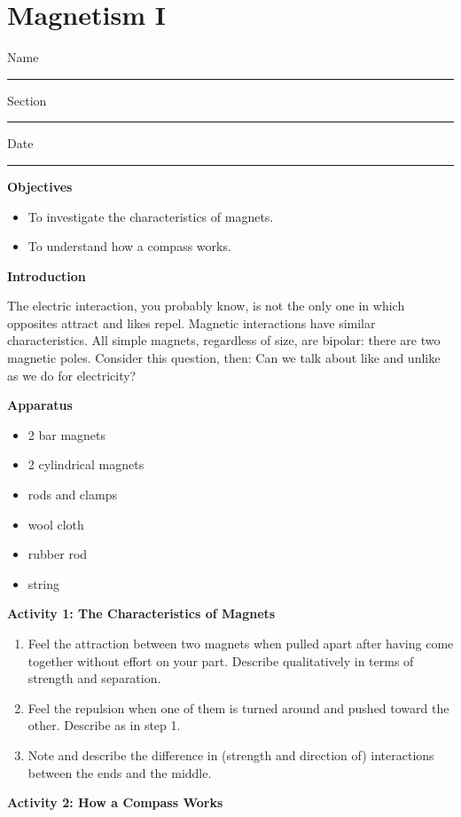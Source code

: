 
\section{Magnetism I}

Name \rule{2.0in}{0.1pt}\hfill{}Section \rule{1.0in}{0.1pt}\hfill{}Date
\rule{1.0in}{0.1pt}

\textbf{Objectives}

\begin{itemize}
\item To investigate the characteristics of magnets.
\item To understand how a compass works.
\end{itemize}
\textbf{Introduction} 

The electric interaction, you probably know, is not the only one in
which opposites attract and likes repel. Magnetic interactions have
similar characteristics. All simple magnets, regardless of size, are
bipolar: there are two magnetic poles. Consider this question, then:
Can we talk about like and unlike as we do for electricity?

\textbf{Apparatus}

\begin{itemize}
\item 2 bar magnets 
\item 2 cylindrical magnets 
\item rods and clamps
\item wool cloth
\item rubber rod
\item string
\end{itemize}
\textbf{Activity 1: The Characteristics of Magnets}

\begin{enumerate}
\item Feel the attraction between two magnets when pulled apart after having
come together without effort on your part. Describe qualitatively
in terms of strength and separation.\vspace{15mm}

\item Feel the repulsion when one of them is turned around and pushed toward
the other. Describe as in step 1.\vspace{15mm}

\item Note and describe the difference in (strength and direction of) interactions
between the ends and the middle.\vspace{15mm}

\end{enumerate}
\textbf{Activity 2: How a Compass Works}

